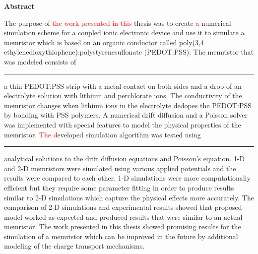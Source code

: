 \documentclass[11pt, a4paper, oneside]{Thesis} %
\newcommand\redout{\bgroup\markoverwith
{\textcolor{red}{\rule[.5ex]{2pt}{1pt}}}\ULon}
\newcommand{\tjs}[1] {\textcolor{red}{#1}}
\newcommand{\tjsr}[2] {\redout{#1}\textcolor{red}{#2}}
\begin{document}
\Large
\textbf{Abstract}
\newline
\begin{doublespace}
The purpose of \tjs{the work presented in this} thesis was to create \tjs{a} numerical simulation scheme for a coupled ionic electronic device and use it to simulate a memristor which is based on an organic conductor called poly(3,4 ethylenedioxythiophene):polystyrenesulfonate (PEDOT:PSS). The memristor that was modeled consists of \tjsr{three major parts,}{} a thin PEDOT:PSS strip with a metal contact on both sides and a drop of an electrolyte solution with lithium and perchlorate ions. The conductivity of the memristor changes when lithium ions in the electrolyte dedopes the PEDOT:PSS by bonding with PSS polymers. A numerical drift diffusion and a Poisson solver was implemented with special features to model the physical properties of the memristor. \tjs{The d}eveloped simulation algorithm was tested using \tjsr{the}{} analytical solutions to the drift diffusion equations and Poisson's equation. 1-D and 2-D memristors were simulated using various applied potentials and the results were compared to each other. 1-D simulations were more computationally efficient but they require some parameter fitting in order to produce results similar to 2-D simulations which capture the physical effects more accurately. The comparison of 2-D simulations and experimental results showed that proposed model worked as expected and produced results that were similar to an actual memristor. The work presented in this thesis showed promising results for the simulation of a memristor which can be improved in the future by additional modeling of the charge transport mechanisms.
\end{doublespace}
\normalsize
\begin{doublespace}

\end{doublespace}



\newpage %



\clearpage %
\end{document}
